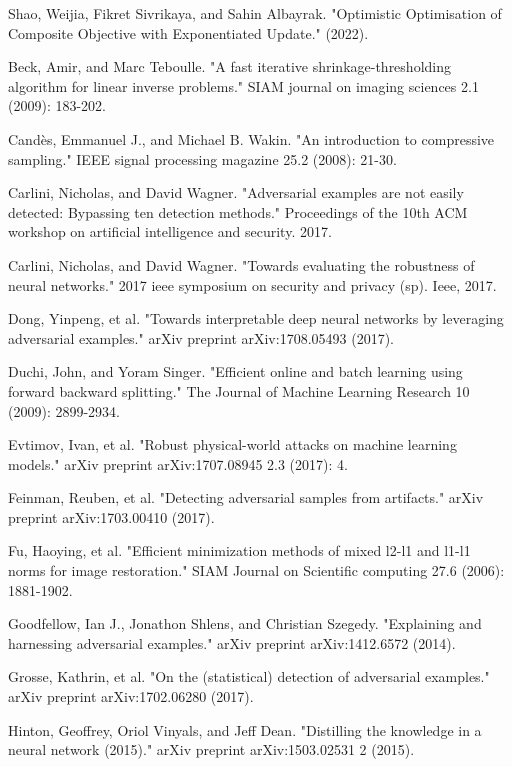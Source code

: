 \begin{thebibliography}{9}
	\bibitem{}
	Shao, Weijia, Fikret Sivrikaya, and Sahin Albayrak. "Optimistic Optimisation of Composite Objective with Exponentiated Update." (2022).

	\bibitem{}
	Beck, Amir, and Marc Teboulle. "A fast iterative shrinkage-thresholding algorithm for linear inverse problems." SIAM journal on imaging sciences 2.1 (2009): 183-202.
	
	\bibitem{}
	Candès, Emmanuel J., and Michael B. Wakin. "An introduction to compressive sampling." IEEE signal processing magazine 25.2 (2008): 21-30.
	
	\bibitem{}
	Carlini, Nicholas, and David Wagner. "Adversarial examples are not easily detected: Bypassing ten detection methods." Proceedings of the 10th ACM workshop on artificial intelligence and security. 2017.
	
	\bibitem{}
	Carlini, Nicholas, and David Wagner. "Towards evaluating the robustness of neural networks." 2017 ieee symposium on security and privacy (sp). Ieee, 2017.
	
	\bibitem{}
	Dong, Yinpeng, et al. "Towards interpretable deep neural networks by leveraging adversarial examples." arXiv preprint arXiv:1708.05493 (2017).
	
	\bibitem{}
	Duchi, John, and Yoram Singer. "Efficient online and batch learning using forward backward splitting." The Journal of Machine Learning Research 10 (2009): 2899-2934.
	
	\bibitem{}
	Evtimov, Ivan, et al. "Robust physical-world attacks on machine learning models." arXiv preprint arXiv:1707.08945 2.3 (2017): 4.
	
	\bibitem{}
	Feinman, Reuben, et al. "Detecting adversarial samples from artifacts." arXiv preprint arXiv:1703.00410 (2017).
	
	\bibitem{}
	Fu, Haoying, et al. "Efficient minimization methods of mixed l2-l1 and l1-l1 norms for image restoration." SIAM Journal on Scientific computing 27.6 (2006): 1881-1902.
	
	\bibitem{}
	Goodfellow, Ian J., Jonathon Shlens, and Christian Szegedy. "Explaining and harnessing adversarial examples." arXiv preprint arXiv:1412.6572 (2014).
	
	\bibitem{}
	Grosse, Kathrin, et al. "On the (statistical) detection of adversarial examples." arXiv preprint arXiv:1702.06280 (2017).
	
	\bibitem{}
	Hinton, Geoffrey, Oriol Vinyals, and Jeff Dean. "Distilling the knowledge in a neural network (2015)." arXiv preprint arXiv:1503.02531 2 (2015).
	

\end{thebibliography}
